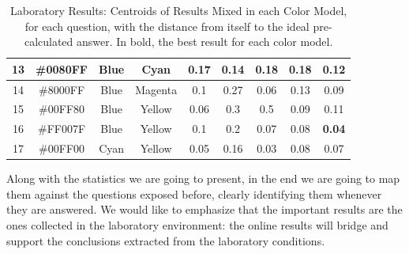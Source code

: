 \begin{table}[htbp]
{\begin{tabular}{@{}ccccccccc@{}}
    \multicolumn{1}{|c|}{13} & \multicolumn{1}{c|}{\cellcolor[HTML]{0080FF}\#0080FF} & \multicolumn{1}{c|}{Blue}    & \multicolumn{1}{c||}{Cyan}    & \multicolumn{1}{c|}{0.17}          & \multicolumn{1}{c|}{0.14}         & \multicolumn{1}{c|}{0.18}          & \multicolumn{1}{c|}{0.18}          & \multicolumn{1}{c|}{0.12}          \\ \midrule
    \multicolumn{1}{|c|}{14} & \multicolumn{1}{c|}{\cellcolor[HTML]{8000FF}\#8000FF} & \multicolumn{1}{c|}{Blue}    & \multicolumn{1}{c||}{Magenta} & \multicolumn{1}{c|}{0.1}           & \multicolumn{1}{c|}{0.27}         & \multicolumn{1}{c|}{0.06}          & \multicolumn{1}{c|}{0.13}          & \multicolumn{1}{c|}{0.09}          \\ \midrule
    \multicolumn{1}{|c|}{15} & \multicolumn{1}{c|}{\cellcolor[HTML]{00FF80}\#00FF80} & \multicolumn{1}{c|}{Blue}    & \multicolumn{1}{c||}{Yellow}  & \multicolumn{1}{c|}{0.06}          & \multicolumn{1}{c|}{0.3}          & \multicolumn{1}{c|}{0.5}           & \multicolumn{1}{c|}{0.09}          & \multicolumn{1}{c|}{0.11}          \\ \midrule
    \multicolumn{1}{|c|}{16} & \multicolumn{1}{c|}{\cellcolor[HTML]{FF007F}\#FF007F} & \multicolumn{1}{c|}{Blue}    & \multicolumn{1}{c||}{Yellow}  & \multicolumn{1}{c|}{0.1}           & \multicolumn{1}{c|}{0.2}          & \multicolumn{1}{c|}{0.07}          & \multicolumn{1}{c|}{0.08}          & \multicolumn{1}{c|}{\textbf{0.04}} \\ \midrule
    \multicolumn{1}{|c|}{17} & \multicolumn{1}{c|}{\cellcolor[HTML]{00FF00}\#00FF00} & \multicolumn{1}{c|}{Cyan}    & \multicolumn{1}{c||}{Yellow}  & \multicolumn{1}{c|}{0.05}          & \multicolumn{1}{c|}{0.16}         & \multicolumn{1}{c|}{0.03}          & \multicolumn{1}{c|}{0.08}          & \multicolumn{1}{c|}{0.07}          \\ \bottomrule
    \end{tabular}}
  \caption[Laboratory Results: Centroids of Results Mixed in each Color Model]{Laboratory Results: Centroids of Results Mixed in each Color Model, for each question, with the distance from itself to the ideal pre-calculated answer. In bold, the best result for each color model.}
  \label{table:colormodels_centroids}
\end{table}
%
Along with the statistics we are going to present, in the end we are going to map them against the questions exposed before, clearly identifying them whenever they are answered. We would like to emphasize that the important
results are the ones collected in the laboratory environment: the online results will bridge and support the conclusions extracted from the laboratory conditions. \par
